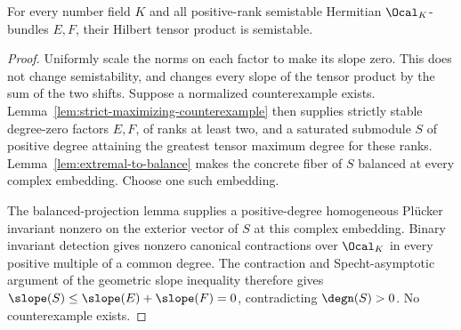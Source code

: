\begin{proposition}
\label{thm:tensor-semistability}
\leanok
For every number field $K$ and all positive-rank semistable Hermitian
$\Ocal_K$-bundles $E,F$, their Hilbert tensor product is semistable.
\end{proposition}
\begin{proof}
Uniformly scale the norms on each factor to make its slope zero.
This does not change semistability, and changes every slope of the
tensor product by the sum of the two shifts. Suppose a normalized
counterexample exists. Lemma~\ref{lem:strict-maximizing-counterexample}
then supplies strictly stable degree-zero factors $E,F$, of ranks at
least two, and a saturated submodule $S$ of positive degree attaining
the greatest tensor maximum degree for these ranks.
Lemma~\ref{lem:extremal-to-balance} makes the concrete fiber of $S$
balanced at every complex embedding. Choose one such embedding.

The balanced-projection lemma supplies a positive-degree homogeneous
Pl\"ucker invariant nonzero on the exterior vector of $S$ at this complex
embedding. Binary invariant detection gives nonzero canonical contractions
over $\Ocal_K$ in every positive multiple of a common degree. The contraction
and Specht-asymptotic argument of the geometric slope inequality therefore
gives $\slope(S)\leq\slope(E)+\slope(F)=0$, contradicting
$\degn(S)>0$. No counterexample exists.
\end{proof}


